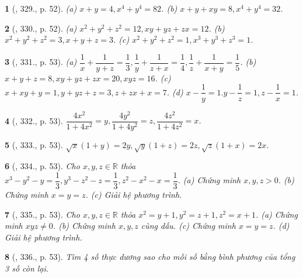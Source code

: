 \documentclass{article}
\newtheorem{baitoan}{}
\begin{document}
\begin{baitoan}[\cite{Binh_Toan_9_tap_2}, 329., p. 52]
	(a) $x + y = 4,x^4 + y^4 = 82$. (b) $x + y + xy = 8,x^4 + y^4 = 32$.
\end{baitoan}

\begin{baitoan}[\cite{Binh_Toan_9_tap_2}, 330., p. 52]
	(a) $x^2 + y^2 + z^2 = 12,xy + yz + zx = 12$. (b) $x^2 + y^2 + z^2 = 3,x + y + z = 3$. (c) $x^2 + y^2 + z^2 = 1,x^3 + y^3 + z^3 = 1$.
\end{baitoan}

\begin{baitoan}[\cite{Binh_Toan_9_tap_2}, 331., p. 53]
	(a) $\dfrac{1}{x} + \dfrac{1}{y + z} = \dfrac{1}{3},\dfrac{1}{y} + \dfrac{1}{z + x} = \dfrac{1}{4},\dfrac{1}{z} + \dfrac{1}{x + y} = \dfrac{1}{5}$. (b) $x + y + z = 8,xy + yz + zx = 20,xyz = 16$. (c) $x + xy + y = 1,y + yz + z = 3,z + zx + x = 7$. (d) $x - \dfrac{1}{y} = 1.y - \dfrac{1}{z} = 1,z - \dfrac{1}{x} = 1$.
\end{baitoan}

\begin{baitoan}[\cite{Binh_Toan_9_tap_2}, 332., p. 53]
	$\dfrac{4x^2}{1 + 4x^2} = y,\dfrac{4y^2}{1 + 4y^2} = z,\dfrac{4z^2}{1 + 4z^2} = x$.
\end{baitoan}

\begin{baitoan}[\cite{Binh_Toan_9_tap_2}, 333., p. 53]
	$\sqrt{x}(1 + y) = 2y,\sqrt{y}(1 + z) = 2z,\sqrt{z}(1 + x) = 2x$.
\end{baitoan}

\begin{baitoan}[\cite{Binh_Toan_9_tap_2}, 334., p. 53]
	Cho $x,y,z\in\mathbb{R}$ thỏa $x^3 - y^2 - y = \dfrac{1}{3},y^3 - z^2 - z = \dfrac{1}{3},z^2 - x^2 - x = \dfrac{1}{3}$. (a) Chứng minh $x,y,z > 0$. (b) Chứng minh $x = y = z$. (c) Giải hệ phương trình.
\end{baitoan}

\begin{baitoan}[\cite{Binh_Toan_9_tap_2}, 335., p. 53]
	Cho $x,y,z\in\mathbb{R}$ thỏa $x^2 = y + 1,y^2 = z + 1,z^2 = x + 1$. (a) Chứng minh $xyz\ne0$. (b) Chứng minh $x,y,z$ cùng dấu. (c) Chứng minh $x = y = z$. (d) Giải hệ phương trình.
\end{baitoan}

\begin{baitoan}[\cite{Binh_Toan_9_tap_2}, 336., p. 53]
	Tìm 4 số thực dương sao cho mỗi số bằng bình phương của tổng 3 số còn lại.
\end{baitoan}
\end{document}
